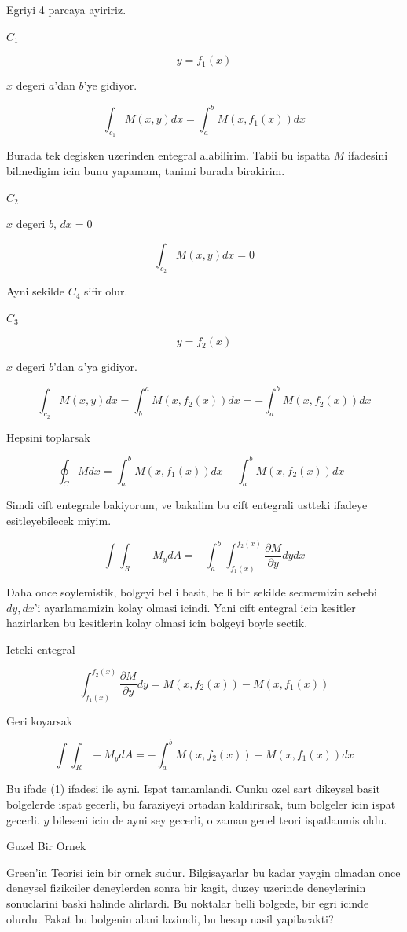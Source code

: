 \documentclass[12pt,fleqn]{article}
\begin{document}
Egriyi 4 parcaya ayiririz. 

$C_1$

\[ y = f_1(x) \]

$x$ degeri $a$'dan $b$'ye gidiyor. 

\[ \int_{c_1}M(x,y) dx = \int_a^b M(x,f_1(x))  dx\]

Burada tek degisken uzerinden entegral alabilirim. Tabii bu ispatta $M$
ifadesini bilmedigim icin bunu yapamam, tanimi burada birakirim. 

$C_2$

$x$ degeri $b$, $dx = 0$

\[ \int_{c_2}M(x,y) dx = 0\]

Ayni sekilde $C_4$ sifir olur. 

$C_3$

\[ y = f_2(x) \]

$x$ degeri $b$'dan $a$'ya gidiyor. 

\[ \int_{c_2}M(x,y) dx = \int_b^a M(x,f_2(x)) dx = 
-  \int_a^b M(x,f_2(x)) dx 
\]

Hepsini toplarsak

\[ \oint_C M dx  =
\int_a^b M(x,f_1(x))  dx -
\int_a^b M(x,f_2(x)) dx  \  \  \ \label{1}
 \]

Simdi cift entegrale bakiyorum, ve bakalim bu cift entegrali ustteki
ifadeye esitleyebilecek miyim. 

\[ \int \int_R -M_y dA = 
- \int_a^b \int_{f_1(x)}^{f_2(x)} \frac{\partial M}{\partial y} dy dx \]

Daha once soylemistik, bolgeyi belli basit, belli bir sekilde secmemizin
sebebi $dy,dx$'i ayarlamamizin kolay olmasi icindi. Yani cift entegral icin
kesitler hazirlarken bu kesitlerin kolay olmasi icin bolgeyi boyle
sectik. 

Icteki entegral

\[ \int_{f_1(x)}^{f_2(x)} \frac{\partial M}{\partial y} dy =
M(x,f_2(x)) - M(x,f_1(x))
 \]

Geri koyarsak

\[ \int \int_R -M_y dA = 
- \int_a^b M(x,f_2(x)) - M(x,f_1(x)) dx \]

Bu ifade (1) ifadesi ile ayni. Ispat tamamlandi. Cunku ozel sart dikeysel
basit bolgelerde ispat gecerli, bu faraziyeyi ortadan kaldirirsak, tum
bolgeler icin ispat gecerli. $y$ bileseni icin de ayni sey gecerli, o zaman
genel teori ispatlanmis oldu.

Guzel Bir Ornek 

Green'in Teorisi icin bir ornek sudur. Bilgisayarlar bu kadar yaygin olmadan
once deneysel fizikciler deneylerden sonra bir kagit, duzey uzerinde
deneylerinin sonuclarini baski halinde alirlardi. Bu noktalar belli
bolgede, bir egri icinde olurdu. Fakat bu bolgenin alani lazimdi, bu hesap
nasil yapilacakti?
\end{document}
